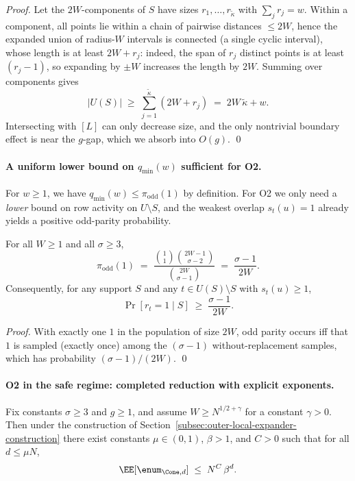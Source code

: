 \begin{proof}
Let the $2W$-components of $S$ have sizes $r_1,\dots,r_{\widetilde\kappa}$ with $\sum_j r_j=w$.
Within a component, all points lie within a chain of pairwise distances $\le 2W$, hence the expanded union of radius-$W$
intervals is connected (a single cyclic interval), whose length is at least $2W + r_j$:
indeed, the span of $r_j$ distinct points is at least $(r_j-1)$, so expanding by $\pm W$ increases the length by $2W$.
Summing over components gives
\[
|U(S)| \;\ge\; \sum_{j=1}^{\widetilde\kappa} (2W+r_j) \;=\; 2W\,\widetilde\kappa + w.
\]
Intersecting with $[L]$ can only decrease size, and the only nontrivial boundary effect is near the $g$-gap, which we
absorb into $O(g)$.
\qed
\end{proof}

\paragraph{A uniform lower bound on $q_{\min}(w)$ sufficient for O2.}
For $w\ge 1$, we have $q_{\min}(w)\le \pi_{\mathrm{odd}}(1)$ by definition.
For O2 we only need a \emph{lower} bound on row activity on $U\setminus S$, and the weakest overlap $s_t(u)=1$ already
yields a positive odd-parity probability.

\begin{lemma}
\label{lem:piodd1}
For all $W\ge 1$ and all $\sigma\ge 3$,
\[
\pi_{\mathrm{odd}}(1)
\;=\;
\frac{\binom{1}{1}\binom{2W-1}{\sigma-2}}{\binom{2W}{\sigma-1}}
\;=\;
\frac{\sigma-1}{2W}.
\]
Consequently, for any support $S$ and any $t\in U(S)\setminus S$ with $s_t(u)\ge 1$,
\[
\Pr[r_t=1\mid S] \;\ge\; \frac{\sigma-1}{2W}.
\]
\end{lemma}

\begin{proof}
With exactly one $1$ in the population of size $2W$, odd parity occurs iff that $1$ is sampled (exactly once) among the
$(\sigma-1)$ without-replacement samples, which has probability $(\sigma-1)/(2W)$. \qed
\end{proof}

\paragraph{O2 in the safe regime: completed reduction with explicit exponents.}

\begin{theorem}
\label{thm:outer-local-expander-spectrum-safe-final}
Fix constants $\sigma\ge 3$ and $g\ge 1$, and assume $W\ge N^{1/2+\gamma}$ for a constant $\gamma>0$.
Then under the construction of Section~\ref{subsec:outer-local-expander-construction} there exist constants
$\mu\in(0,1)$, $\beta>1$, and $C>0$ such that for all $d\le \mu N$,
\[
\EE[\enum_{\Cone,d}] \;\le\; N^{C}\,\beta^{d}.
\]
\end{theorem}


